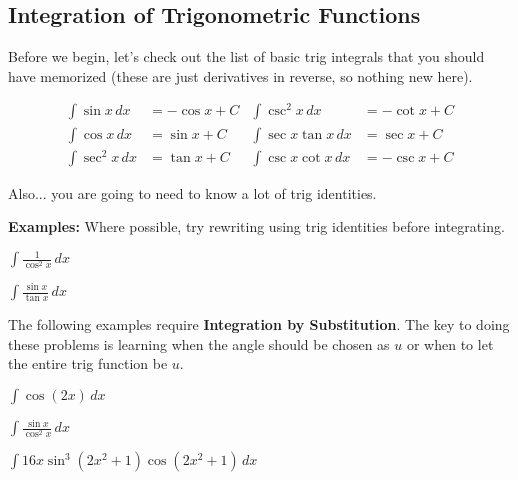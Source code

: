 \subsection*{Integration of Trigonometric Functions}
Before we begin, let's check out the list of basic trig integrals that you should have memorized (these are just derivatives in reverse, so nothing new here).

\begin{tcolorbox}[title= INTEGRALS OF BASIC TRIG FUNCTIONS,colframe=black,sharp corners,colback=white,colbacktitle=white,coltitle=black,boxrule=1pt]

    \begin{align*}
        \int\sin x\,dx &= -\cos x+C & \int\csc^2 x\,dx &= -\cot x+C\\
        \int\cos x\,dx &= \sin x+C & \int\sec x\tan x\,dx &= \sec x+C\\
        \int\sec^2 x\,dx &= \tan x+C & \int\csc x\cot x\,dx &= -\csc x+C
    \end{align*}
    \vspace{.05cm}
\end{tcolorbox}
Also... you are going to need to know a lot of trig identities.

\noindent\textbf{Examples:} Where possible, try rewriting using trig identities before integrating.
\begin{questions}
    \question $\displaystyle\int\frac{1}{\cos^2 x}\,dx$
    
    \question $\displaystyle\int\frac{\sin x}{\tan x}\,dx$
    
    
    The following examples require \textbf{Integration by Substitution}. The key to doing these problems is learning when the angle should be chosen as $u$ or when to let the entire trig function be $u$.
    
    \begin{minipage}{0.45\linewidth}
        \question $\displaystyle\int\cos(2x)\,dx$    
    \end{minipage}
    \hfill
    \begin{minipage}{0.45\linewidth}
        \question $\displaystyle\int\frac{\sin x}{\cos^2 x}\,dx$
    \end{minipage}
    
    
    \newpage
    
    \question $\displaystyle\int 16x\sin^3\left(2x^2+1\right)\cos\left(2x^2+1\right) \,dx$
\end{questions}


